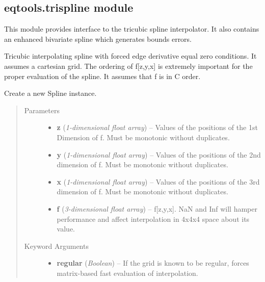 \documentclass[letterpaper,10pt,english]{sphinxmanual}
\begin{document}
\subsection{eqtools.trispline module}
\label{eqtools:eqtools-trispline-module}\label{eqtools:module-eqtools.trispline}
This module provides interface to the tricubic spline interpolator. It also
contains an enhanced bivariate spline which generates bounds errors.

\begin{fulllineitems}
\label{eqtools:eqtools.trispline.Spline}
Tricubic interpolating spline with forced edge derivative equal zero
conditions.  It assumes a cartesian grid.  The ordering of f{[}z,y,x{]} is
extremely important for the proper evaluation of the spline.  It assumes
that f is in C order.

Create a new Spline instance.
\begin{quote}\begin{description}
\item[{Parameters}] \leavevmode\begin{itemize}
\item {} 
\textbf{z} (\emph{1-dimensional float array}) --
Values of the positions of the 1st
Dimension of f. Must be monotonic without duplicates.

\item {} 
\textbf{y} (\emph{1-dimensional float array}) --
Values of the positions of the 2nd
dimension of f. Must be monotonic without duplicates.

\item {} 
\textbf{x} (\emph{1-dimensional float array}) --
Values of the positions of the 3rd
dimension of f. Must be monotonic without duplicates.

\item {} 
\textbf{f} (\emph{3-dimensional float array}) --
f{[}z,y,x{]}. NaN and Inf will hamper
performance and affect interpolation in 4x4x4 space about its value.

\end{itemize}

\item[{Keyword Arguments}] \leavevmode\begin{itemize}
\item {} 
\textbf{regular} (\emph{Boolean}) --
If the grid is known to be regular, forces
matrix-based fast evaluation of interpolation.


\end{itemize}
\end{description}
\end{quote}
\end{fulllineitems}
\end{document}
